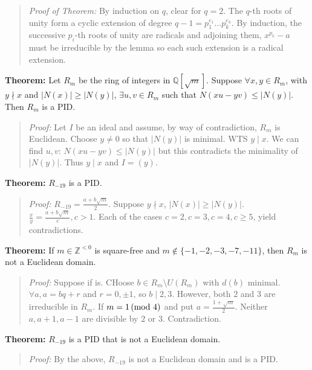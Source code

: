 \begin{quote}
\emph{Proof of Theorem:}
By induction on $q$, clear for $q=2$.  The $q$-th roots of unity form a cyclic extension of
degree $q-1= p_1^{e_1} \ldots p_k^{e_k}$.  By induction, the successive $p_i$-th roots of unity
are radicals and adjoining them, $x^{p_k}-a$ must be irreducible by the lemma so each such
extension is a radical extension.
\end{quote}
{\bf Theorem:} Let $R_m$ be the ring of integers in ${\mathbb Q}[{\sqrt m}]$.  Suppose
$\forall x, y\in R_m$, with $y \nmid x$ and $|N(x)| \ge |N(y)|$, $\exists u, v \in R_m$ such that
$N(xu-yv) \leq |N(y)|$. Then $R_m$ is a PID.
\begin{quote}
\emph{Proof:} Let $I$ be an ideal and assume, by way of contradiction, $R_m$ is Euclidean.
Choose $y \ne 0$ so that $|N(y)|$ is minimal.  WTS $y \mid x$.  We can find
$u, v$: $N(xu-yv) \leq |N(y)|$ but this contradicts the minimality of $|N(y)|$.  Thus
$y \mid x$ and $I = (y)$.
\end{quote}
{\bf Theorem:} $R_{-19}$ is a PID.
\begin{quote}
\emph{Proof:} $R_{-19} = {\frac {a + b {\sqrt m}} {2}}$.  Suppose $y \nmid x$, $|N(x)| \geq |N(y)|$.
${\frac {x} {y}} = {\frac {a + b {\sqrt m}} {c}}, c > 1$.  Each of the cases $c=2, c=3, c=4, c \geq 5$,
yield contradictions.
\end{quote}
{\bf Theorem:} If $m \in {\mathbb Z}^{<0}$ is square-free and $m \notin \{-1, -2, -3, -7, -11 \}$,
then $R_m$ is not a Euclidean domain.
\begin{quote}
\emph{Proof:}
Suppose if is.  CHoose $b \in R_m \setminus U(R_m)$ with $d(b)$ minimal.
$\forall a, a=bq+r$ and $r =0, \pm  1$, so $b \mid 2, 3$.  However,
both $2$ and $3$ are irreducible in $R_m$.  If $m = 1 \thinspace \textnormal{(mod } 4 \textnormal{)}$ and put $a= {\frac {1 + {\sqrt m}} {2}}$.
Neither $a, a+1, a-1$ are divisible by $2$ or $3$.  Contradiction.
\end{quote}
{\bf Theorem:} $R_{-19}$ is a PID that is not a Euclidean domain.
\begin{quote}
\emph{Proof:}  By the above, $R_{-19}$ is not a Euclidean domain and is a PID.
\end{quote}
